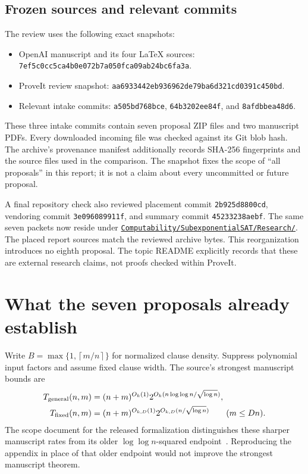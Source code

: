\documentclass[11pt,letterpaper]{article}
\numberwithin{equation}{section}
\theoremstyle{definition}\newtheorem{definition}[theorem]{Definition}
\theoremstyle{remark}\newtheorem{remark}[theorem]{Remark}
\newcommand{\ceil}[1]{\left\lceil #1\right\rceil}
\newcommand{\srcsha}{\texttt{7ef5c0cc5ca4b0e072b7a050fca09ab24bc6fa3a}}
\newcommand{\reposha}{\texttt{aa6933442eb936962de79ba6d321cd0391c450bd}}
\begin{document}
\subsection{Frozen sources and relevant commits}

The review uses the following exact snapshots:
\begin{itemize}
\item OpenAI manuscript and its four LaTeX sources: \srcsha.
\item ProveIt review snapshot: \reposha.
\item Relevant intake commits: \texttt{a505bd768bce}, \texttt{64b3202ee84f}, and \texttt{8afdbbea48d6}.
\end{itemize}
These three intake commits contain seven proposal ZIP files and two manuscript PDFs. Every downloaded incoming file was checked against its Git blob hash. The archive's provenance manifest additionally records SHA-256 fingerprints and the source files used in the comparison. The snapshot fixes the scope of ``all proposals'' in this report; it is not a claim about every uncommitted or future proposal.

A final repository check also reviewed placement commit \texttt{2b925d8800cd}, vendoring commit \texttt{3e096089911f}, and summary commit \texttt{45233238aebf}. The same seven packets now reside under \href{https://github.com/VladimirReshetnikov/ProveIt/tree/45233238aebf0e0a80f5a6cc39dbeaf1b28d9f9d/Computability/SubexponentialSAT}{\texttt{Computability/SubexponentialSAT/Research/}}. The placed report sources match the reviewed archive bytes. This reorganization introduces no eighth proposal. The topic README explicitly records that these are external research claims, not proofs checked within ProveIt.

\section{What the seven proposals already establish}
\label{sec:prior}

Write $B=\max\{1,\ceil{m/n}\}$ for normalized clause density. Suppress polynomial input factors and assume fixed clause width. The source's strongest manuscript bounds are
\begin{align}
 T_{\rm general}(n,m)&=(n+m)^{O_k(1)}
  2^{O_k(n\log\log n/\sqrt{\log n})},\label{eq:sat-general}\\
 T_{\rm fixed}(n,m)&=(n+m)^{O_{k,D}(1)}
  2^{O_{k,D}(n/\sqrt{\log n})}\qquad(m\le Dn).\label{eq:sat-fixed}
\end{align}
The scope document for the released formalization distinguishes these sharper manuscript rates from its older $\log\log n$-squared endpoint~\cite{scope}. Reproducing the appendix in place of that older endpoint would not improve the strongest manuscript theorem.
\end{document}
